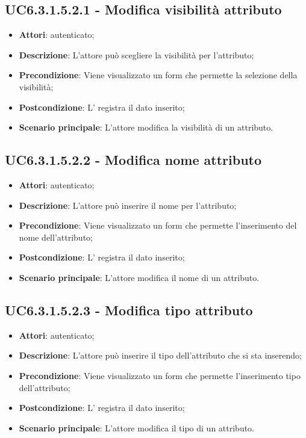 \subsection{UC6.3.1.5.2.1 - Modifica visibilità attributo}
\label{ssec:UC6.3.1.5.2.1}
\begin{itemize}
\item \textbf{Attori}:  autenticato;
\item \textbf{Descrizione}: L'attore può scegliere la visibilità per l'attributo;
\item \textbf{Precondizione}: Viene visualizzato un form che permette la selezione della visibilità;
\item \textbf{Postcondizione}: L' registra il dato inserito;
\item \textbf{Scenario principale}: L'attore modifica la visibilità di un attributo.
\end{itemize}
\subsection{UC6.3.1.5.2.2 - Modifica nome attributo}
\label{ssec:UC6.3.1.5.2.2}
\begin{itemize}
\item \textbf{Attori}:  autenticato;
\item \textbf{Descrizione}: L'attore può inserire il nome per l'attributo;
\item \textbf{Precondizione}: Viene visualizzato un form che permette l'inserimento del nome dell'attributo;
\item \textbf{Postcondizione}: L' registra il dato inserito;
\item \textbf{Scenario principale}: L'attore modifica il nome di un attributo.
\end{itemize}
\subsection{UC6.3.1.5.2.3 - Modifica tipo attributo}
\label{ssec:UC6.3.1.5.2.3}
\begin{itemize}
\item \textbf{Attori}:  autenticato;
\item \textbf{Descrizione}: L'attore può inserire il tipo dell'attributo che si sta inserendo;
\item \textbf{Precondizione}: Viene visualizzato un form che permette l'inserimento tipo dell'attributo;
\item \textbf{Postcondizione}: L' registra il dato inserito;
\item \textbf{Scenario principale}: L'attore modifica il tipo di un attributo.
\end{itemize}
